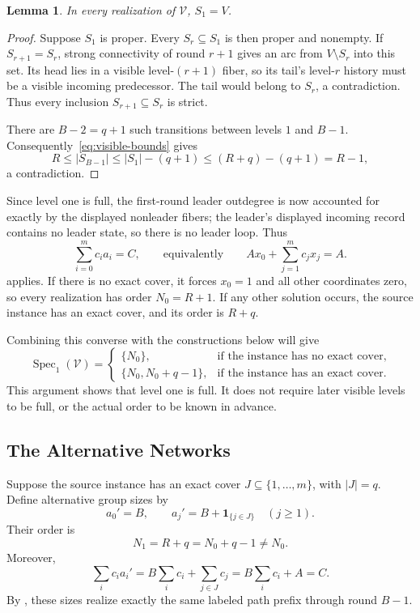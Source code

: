 \documentclass[11pt]{article}
\newtheorem{lemma}{Lemma}
\begin{document}
\begin{lemma}
\label{lem:conp-first-full}
In every realization of \(\mathcal V\), \(S_1=V\).
\end{lemma}

\begin{proof}
Suppose \(S_1\) is proper. Every \(S_r\subseteq S_1\) is then
proper and nonempty. If \(S_{r+1}=S_r\), strong connectivity of
round \(r+1\) gives an arc from \(V\setminus S_r\) into this set.
Its head lies in a visible level-\((r+1)\) fiber, so its tail's
level-\(r\) history must be a visible incoming predecessor.
The tail would belong to \(S_r\), a contradiction.
Thus every inclusion \(S_{r+1}\subseteq S_r\) is strict.

There are \(B-2=q+1\) such transitions between levels \(1\)
and \(B-1\). Consequently~\eqref{eq:visible-bounds} gives
\[
 R\leq |S_{B-1}|
   \leq |S_1|-(q+1)
   \leq (R+q)-(q+1)=R-1,
\]
a contradiction.
\end{proof}

Since level one is full, the first-round leader outdegree is
now accounted for exactly by the displayed nonleader fibers; the
leader's displayed incoming record contains no leader state, so there
is no leader loop. Thus
\[
 \sum_{i=0}^m c_i a_i=C,
 \qquad\text{equivalently}\qquad
 A x_0+\sum_{j=1}^m c_jx_j=A.
\]
 applies. If there is no exact cover, it forces
\(x_0=1\) and all other coordinates zero, so every realization has
order \(N_0=R+1\). If any other solution occurs, the source
instance has an exact cover, and its order is \(R+q\).

Combining this converse with the constructions below will give
\[
 \operatorname{Spec}_1(\mathcal V)=
 \begin{cases}
  \{N_0\},&\text{if the instance has no exact cover},\\
  \{N_0,N_0+q-1\},&\text{if the instance has an exact cover}.
 \end{cases}
\]
This argument shows that level one is full. It does not require later
visible levels to be full, or the actual order to be known in advance.

\subsection{The Alternative Networks}

Suppose the source instance has an exact cover \(J\subseteq
\{1,\ldots,m\}\), with \(|J|=q\). Define alternative group sizes by
\[
 a_0'=B,\qquad
 a_j'=B+\mathbf 1_{\{j\in J\}}\quad(j\geq1).
\]
Their order is
\[
 N_1=R+q=N_0+q-1\ne N_0.
\]
Moreover,
\[
 \sum_i c_i a_i'
   =B\sum_i c_i+\sum_{j\in J}c_j
   =B\sum_i c_i+A=C.
\]
By , these sizes realize exactly the same
labeled path prefix through round \(B-1\).
\end{document}
